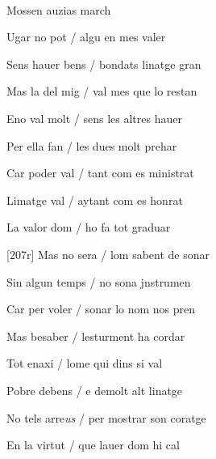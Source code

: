 \documentclass[12pt]{article}
\renewcommand{\espaiAbansEtiquetaPoema}{\vspace{0ex}}
\begin{document}
\begin{estrofa}

\espaiAbansEtiquetaPoema

\\

\begin{rubrica}

Mossen auzias march \clauTancada

\end{rubrica}

\end{estrofa}


\begin{estrofa}

 Ugar no pot / algu en mes valer

 Sens hauer bens / bondats linatge gran

 Mas la del mig / val mes que lo restan

 Eno val molt / sens les altres hauer

 Per ella fan / les dues molt prehar

 Car poder val / tant com es ministrat

 Limatge val / aytant com es honrat

 La valor dom / ho fa tot graduar

\end{estrofa}



\begin{estrofa}

 [207r] Mas no sera / lom sabent de sonar

 Sin algun temps / no sona jnstrumen

 Car per voler / sonar lo nom nos pren

 Mas besaber / lesturment ha cordar

 Tot enaxi / lome qui dins si val

 Pobre debens / e demolt alt linatge

 No tels arre\textit{us} / per mostrar son coratge

 En la virtut / que lauer dom hi cal

\end{estrofa}
\end{document}
